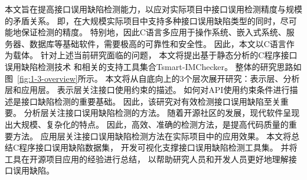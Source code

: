 本文旨在提高接口误用缺陷检测能力，以应对实际项目中接口误用检测精度与规模的矛盾关系。
即，在大规模实际项目中支持多种接口误用缺陷类型的同时，尽可能地保证检测的精度。
特别地，因此C语言多应用于操作系统、嵌入式系统、服务器、数据库等基础软件，需要极高的可靠性和安全性。
因此，本文以C语言作为载体。
针对上述当前研究面临的问题，
本文将提出基于静态分析的C程序接口误用缺陷检测技术
和相关的支持工具集合Tsmart-IMChecker。
整体的研究思路如图~\ref{fig:1-3-overview}所示。
本文将从自底向上的3个层次展开研究：表示层、分析层和应用层。
表示层关注接口使用约束的描述。
如何对API使用约束条件进行描述是接口缺陷检测的重要基础。
因此，该研究对有效检测接口误用缺陷至关重要。
分析层关注接口误用缺陷检测的方法。
随着开源社区的发展，现代软件呈现出大规模、复杂化的特点。
因此，高效、准确的检测方法，是提高代码质量的重要方法。
应用层关注接口误用缺陷检测方法在实际项目中的应用效果。
本文将总结C程序接口误用缺陷数据集，
开发可视化支撑接口误用缺陷检测工具集。
并将工具在开源项目应用的经验进行总结，
以帮助研究人员和开发人员更好地理解接口误用缺陷。


